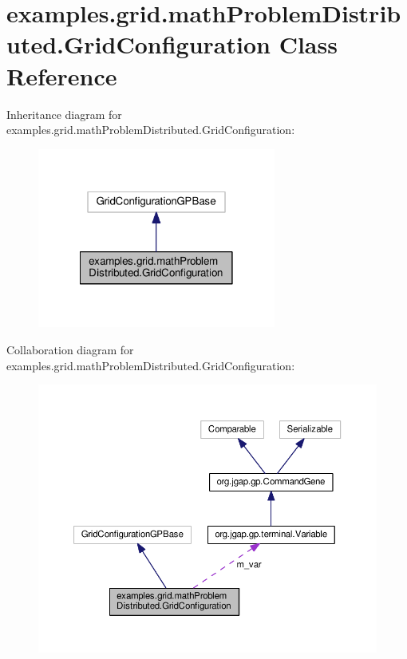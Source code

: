 \hypertarget{classexamples_1_1grid_1_1math_problem_distributed_1_1_grid_configuration}{\section{examples.\-grid.\-math\-Problem\-Distributed.\-Grid\-Configuration Class Reference}
\label{classexamples_1_1grid_1_1math_problem_distributed_1_1_grid_configuration}
}


Inheritance diagram for examples.\-grid.\-math\-Problem\-Distributed.\-Grid\-Configuration\-:
\nopagebreak
\begin{figure}[H]
\begin{center}
\leavevmode
\includegraphics[width=222pt]{classexamples_1_1grid_1_1math_problem_distributed_1_1_grid_configuration__inherit__graph}
\end{center}
\end{figure}


Collaboration diagram for examples.\-grid.\-math\-Problem\-Distributed.\-Grid\-Configuration\-:
\nopagebreak
\begin{figure}[H]
\begin{center}
\leavevmode
\includegraphics[width=350pt]{classexamples_1_1grid_1_1math_problem_distributed_1_1_grid_configuration__coll__graph}
\end{center}
\end{figure}
